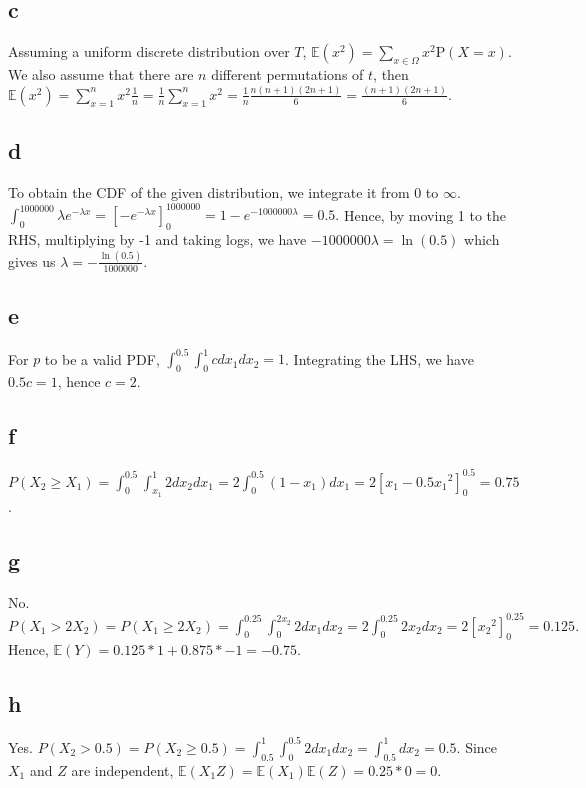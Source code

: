\documentclass[twoside]{homework}
\begin{document}
\subsection*{c}
Assuming a uniform discrete distribution over $T$, $\mathbb{E}(x^2) = \sum_{x \in \Omega} x^2 \textrm{P}(X = x)$. We also assume that there are $n$ different permutations of $t$, then $\mathbb{E}(x^2) = \sum_{x = 1}^{n} x^2 \frac{1}{n} = \frac{1}{n} \sum_{x = 1}^{n} x^2 = \frac{1}{n}\frac{n(n+1)(2n+1)}{6} = \frac{(n+1)(2n+1)}{6}$.

\subsection*{d}
To obtain the CDF of the given distribution, we integrate it from 0 to $\infty$. $\int_{0}^{1000000} \lambda e^{-\lambda x} = [-e^{-\lambda x}]_{0}^{1000000} = 1 - e^{-1000000 \lambda} = 0.5.$ Hence, by moving 1 to the RHS, multiplying by -1 and taking logs, we have $-1000000 \lambda = \ln(0.5)$ which gives us $\lambda = -\frac{\ln(0.5)}{1000000}$.

\subsection*{e}
For $p$ to be a valid PDF, $\int_{0}^{0.5} \int_{0}^{1} c dx_1 dx_2 = 1$. Integrating the LHS, we have $0.5c = 1$, hence $c = 2$. 

\subsection*{f}
$P(X_2 \ge X_1) = \int_{0}^{0.5} \int_{x_1}^{1} 2 dx_2 dx_1 = 2 \int_{0}^{0.5} (1 - x_1) dx_1 = 2[x_1 - 0.5 {x_1}^2]_{0}^{0.5} = 0.75$.

\subsection*{g}
No. $P(X_1 > 2X_2) = P(X_1 \ge 2X_2) = \int_{0}^{0.25} \int_{0}^{2x_2} 2 dx_1 dx_2 = 2 \int_{0}^{0.25} 2x_2 dx_2 = 2[{x_2}^2]_0^{0.25} = 0.125.$ Hence, $\mathbb{E}(Y) = 0.125 * 1 + 0.875 * -1 = -0.75$.

\subsection*{h}
Yes. $P(X_2 > 0.5) = P(X_2 \ge 0.5) = \int_{0.5}^{1} \int_{0}^{0.5} 2 dx_1 dx_2 = \int_{0.5}^{1} dx_2 = 0.5$. Since $X_1$ and $Z$ are independent, $\mathbb{E}(X_1 Z) = \mathbb{E}(X_1) \mathbb{E}(Z) = 0.25 * 0 = 0$.
\end{document}
